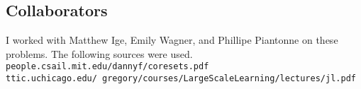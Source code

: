 \documentclass[letterpaper, 11pt]{article}
\begin{document}
\subsection*{Collaborators}
I worked with Matthew Ige, Emily Wagner, and Phillipe Piantonne on these problems. The following sources were used.\\
\texttt{people.csail.mit.edu/dannyf/coresets.pdf}\\
\texttt{ttic.uchicago.edu/~gregory/courses/LargeScaleLearning/lectures/jl.pdf}
\end{document}
